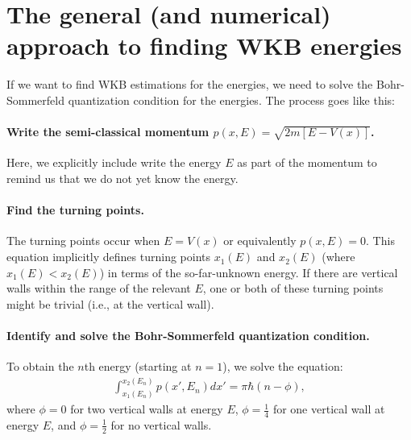 \documentclass[10pt]{article}
\newcommand{\1}{\mathbf 1}
\begin{document}
\section*{The general (and numerical) approach to finding WKB energies}

If we want to find WKB estimations for the energies, we need to solve the Bohr-Sommerfeld quantization condition for the energies.
The process goes like this:

\paragraph{Write the semi-classical momentum $p(x,E) = \sqrt{2m[E - V(x)]}$.}
Here, we explicitly include write the energy $E$ as part of the momentum to remind us that we do not yet know the energy.

\paragraph{Find the turning points.}
The turning points occur when $E = V(x)$ or equivalently $p(x,E) = 0$.
This equation implicitly defines turning points $x_1(E)$ and $x_2(E)$ (where $x_1(E) < x_2(E)$) in terms of the so-far-unknown energy.
If there are vertical walls within the range of the relevant $E$, one or both of these turning points might be trivial (i.e., at the vertical wall).

\paragraph{Identify and solve the Bohr-Sommerfeld quantization condition.}
To obtain the $n$th energy (starting at $n=1$), we solve the equation:
\begin{align}
	\int_{x_1(E_n)}^{x_2(E_n)}
	p(x',E_n) dx'
	=
	\pi \hbar (n - \phi),
\end{align}
where $\phi = 0$ for two vertical walls at energy $E$, $\phi = \frac{1}{4}$ for one vertical wall at energy $E$, and $\phi = \frac{1}{2}$ for no vertical walls.

\end{document}
